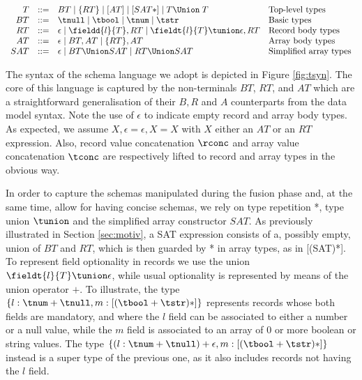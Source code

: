 \begin{figure*}[ht]
\[
\begin{array}{r*{3}{l}}
T 	&::= & BT   \mid  \{ RT\}   \mid  [AT]   \mid  [SAT*]  \mid   T\Union\; T  & \text{Top-level types} \\
BT 	&::= &  \tnull  \mid \tbool \mid \tnum \mid \tstr   & \text{Basic types} \\
RT   &::=&   \epsilon \mid \fieldd{l}{T}, RT \mid  \fieldt{l}{T}\tunion\epsilon, RT  & \text{Record body types} \\
AT    &::= &  \epsilon   \mid  BT , AT  \mid  \{RT\} , AT  & \text{Array body types} \\
SAT    &::= &  \epsilon   \mid BT \Union SAT    \mid RT \Union SAT & \text{Simplified array types} \\

\end{array}
\]

\caption{Syntax of the JSON type language.}
\label{fig:tsyn}
\end{figure*}

\medskip
The syntax of the \json\/  schema language we adopt  is depicted in Figure \ref{fig:tsyn}.
The core of this language is captured by the non-terminals $BT$, $RT$, and $AT$ which are a straightforward generalisation of their $B, R$ and $A$ counterparts from the data model syntax. Note the use of $\epsilon$ to indicate empty record and array body types. As expected, we assume $X,\epsilon=\epsilon, X=X$ with $X$ either an $AT$ or an $RT$ expression. Also, record value concatenation $\rconc$ and array value  concatenation  $\tconc$ are respectively lifted to record and array types in the obvious way. 



In order to capture the schemas manipulated during the fusion phase and, at the same time, allow for having concise schemas, we rely on type repetition  *, type union $\tunion$ and the simplified array constructor $SAT$.
As previously  illustrated in Section \ref{sec:motiv},  a SAT expression consists of a, possibly empty,  union of $BT$  and $RT$, which is then guarded by  * in array types, as in  [(SAT)*].  To represent field  optionality in records we use the union $\fieldt{l}{T}\tunion\epsilon$, while usual optionality is represented by means of the union operator $+$. To illustrate, the type $\{l: \tnum +\tnull, m: [(\tbool + \tstr)*]\}$ represents records whose both fields are mandatory, and where the $l$ field can be associated to either a number or a null value, while the $m$ field is associated to an array of $0$ or more boolean or string values. The type $\{(l: \tnum +\tnull)+\epsilon, m: [(\tbool + \tstr)*]\}$ instead is a super type of the previous one, as it also includes records not having the $l$ field.



